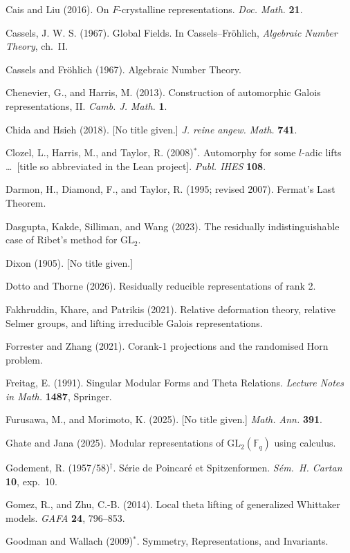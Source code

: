 \begin{list}{}{\setlength{\leftmargin}{1.5em}\setlength{\itemindent}{-1.5em}\setlength{\itemsep}{2pt}\setlength{\parsep}{0pt}}
\item Cais and Liu (2016). On $F$-crystalline representations. \emph{Doc. Math.} \textbf{21}.
\item Cassels, J. W. S. (1967). Global Fields. In Cassels--Fr\"ohlich, \emph{Algebraic Number
  Theory}, ch.~II.
\item Cassels and Fr\"ohlich (1967). Algebraic Number Theory.
\item Chenevier, G., and Harris, M. (2013). Construction of automorphic Galois representations, II.
  \emph{Camb. J. Math.} \textbf{1}.
\item Chida and Hsieh (2018). [No title given.] \emph{J. reine angew. Math.} \textbf{741}.
\item Clozel, L., Harris, M., and Taylor, R. (2008)$^*$. Automorphy for some $l$-adic lifts \dots\
  [title so abbreviated in the Lean project]. \emph{Publ. IHES} \textbf{108}.
\item Darmon, H., Diamond, F., and Taylor, R. (1995; revised 2007). Fermat's Last Theorem.
\item Dasgupta, Kakde, Silliman, and Wang (2023). The residually indistinguishable case of Ribet's
  method for $\mathrm{GL}_2$.
\item Dixon (1905). [No title given.]
\item Dotto and Thorne (2026). Residually reducible representations of rank 2.
\item Fakhruddin, Khare, and Patrikis (2021). Relative deformation theory, relative Selmer groups,
  and lifting irreducible Galois representations.
\item Forrester and Zhang (2021). Corank-1 projections and the randomised Horn problem.
\item Freitag, E. (1991). Singular Modular Forms and Theta Relations. \emph{Lecture Notes in Math.}
  \textbf{1487}, Springer.
\item Furusawa, M., and Morimoto, K. (2025). [No title given.] \emph{Math. Ann.} \textbf{391}.
\item Ghate and Jana (2025). Modular representations of $\mathrm{GL}_2(\mathbb{F}_q)$ using calculus.
\item Godement, R. (1957/58)$^\dagger$. S\'erie de Poincar\'e et Spitzenformen. \emph{S\'em.\ H.
  Cartan} \textbf{10}, exp.~10.
\item Gomez, R., and Zhu, C.-B. (2014). Local theta lifting of generalized Whittaker models.
  \emph{GAFA} \textbf{24}, 796--853.
\item Goodman and Wallach (2009)$^*$. Symmetry, Representations, and Invariants.

\end{list}
